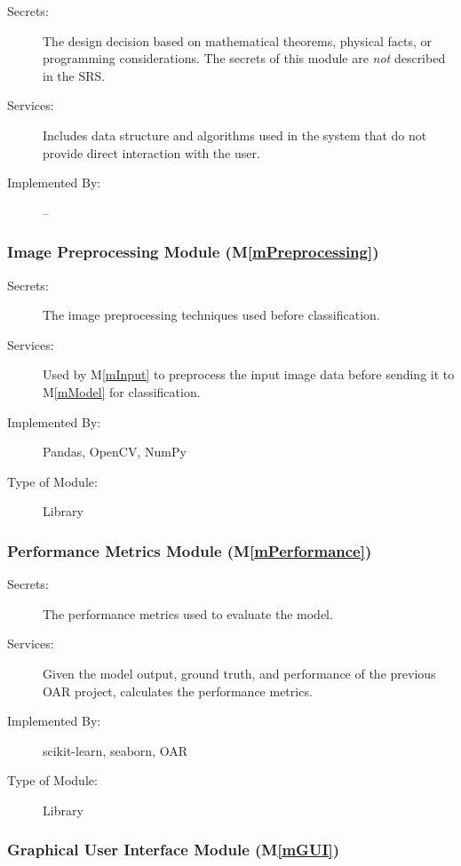 \documentclass[12pt, titlepage]{article}
\newcommand{\mref}[1]{M\ref{#1}}
\begin{document}
\begin{description}
\item[Secrets:] The design decision based on mathematical theorems, physical
  facts, or programming considerations. The secrets of this module are
  \emph{not} described in the SRS.
\item[Services:] Includes data structure and algorithms used in the system that
  do not provide direct interaction with the user. 
\item[Implemented By:] --
\end{description}

\subsubsection{Image Preprocessing Module (\mref{mPreprocessing})}

\begin{description}
\item[Secrets:] The image preprocessing techniques used before classification.
\item[Services:] Used by \mref{mInput} to preprocess the input image data before
sending it to \mref{mModel} for classification.
\item[Implemented By:] Pandas, OpenCV, NumPy
\item[Type of Module:] Library
\end{description}

\subsubsection{Performance Metrics Module (\mref{mPerformance})}

\begin{description}
\item[Secrets:] The performance metrics used to evaluate the model.
\item[Services:] Given the model output, ground truth, and performance of the
previous OAR project, calculates the performance metrics.
\item[Implemented By:] scikit-learn, seaborn, OAR
\item[Type of Module:] Library
\end{description}

\subsubsection{Graphical User Interface Module (\mref{mGUI})}
\end{document}
